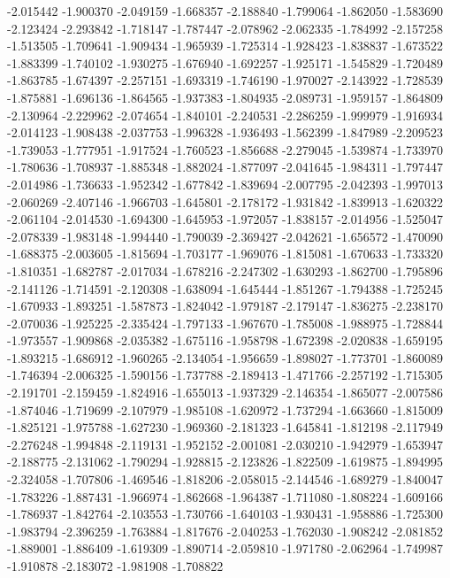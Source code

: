-2.015442
-1.900370
-2.049159
-1.668357
-2.188840
-1.799064
-1.862050
-1.583690
-2.123424
-2.293842
-1.718147
-1.787447
-2.078962
-2.062335
-1.784992
-2.157258
-1.513505
-1.709641
-1.909434
-1.965939
-1.725314
-1.928423
-1.838837
-1.673522
-1.883399
-1.740102
-1.930275
-1.676940
-1.692257
-1.925171
-1.545829
-1.720489
-1.863785
-1.674397
-2.257151
-1.693319
-1.746190
-1.970027
-2.143922
-1.728539
-1.875881
-1.696136
-1.864565
-1.937383
-1.804935
-2.089731
-1.959157
-1.864809
-2.130964
-2.229962
-2.074654
-1.840101
-2.240531
-2.286259
-1.999979
-1.916934
-2.014123
-1.908438
-2.037753
-1.996328
-1.936493
-1.562399
-1.847989
-2.209523
-1.739053
-1.777951
-1.917524
-1.760523
-1.856688
-2.279045
-1.539874
-1.733970
-1.780636
-1.708937
-1.885348
-1.882024
-1.877097
-2.041645
-1.984311
-1.797447
-2.014986
-1.736633
-1.952342
-1.677842
-1.839694
-2.007795
-2.042393
-1.997013
-2.060269
-2.407146
-1.966703
-1.645801
-2.178172
-1.931842
-1.839913
-1.620322
-2.061104
-2.014530
-1.694300
-1.645953
-1.972057
-1.838157
-2.014956
-1.525047
-2.078339
-1.983148
-1.994440
-1.790039
-2.369427
-2.042621
-1.656572
-1.470090
-1.688375
-2.003605
-1.815694
-1.703177
-1.969076
-1.815081
-1.670633
-1.733320
-1.810351
-1.682787
-2.017034
-1.678216
-2.247302
-1.630293
-1.862700
-1.795896
-2.141126
-1.714591
-2.120308
-1.638094
-1.645444
-1.851267
-1.794388
-1.725245
-1.670933
-1.893251
-1.587873
-1.824042
-1.979187
-2.179147
-1.836275
-2.238170
-2.070036
-1.925225
-2.335424
-1.797133
-1.967670
-1.785008
-1.988975
-1.728844
-1.973557
-1.909868
-2.035382
-1.675116
-1.958798
-1.672398
-2.020838
-1.659195
-1.893215
-1.686912
-1.960265
-2.134054
-1.956659
-1.898027
-1.773701
-1.860089
-1.746394
-2.006325
-1.590156
-1.737788
-2.189413
-1.471766
-2.257192
-1.715305
-2.191701
-2.159459
-1.824916
-1.655013
-1.937329
-2.146354
-1.865077
-2.007586
-1.874046
-1.719699
-2.107979
-1.985108
-1.620972
-1.737294
-1.663660
-1.815009
-1.825121
-1.975788
-1.627230
-1.969360
-2.181323
-1.645841
-1.812198
-2.117949
-2.276248
-1.994848
-2.119131
-1.952152
-2.001081
-2.030210
-1.942979
-1.653947
-2.188775
-2.131062
-1.790294
-1.928815
-2.123826
-1.822509
-1.619875
-1.894995
-2.324058
-1.707806
-1.469546
-1.818206
-2.058015
-2.144546
-1.689279
-1.840047
-1.783226
-1.887431
-1.966974
-1.862668
-1.964387
-1.711080
-1.808224
-1.609166
-1.786937
-1.842764
-2.103553
-1.730766
-1.640103
-1.930431
-1.958886
-1.725300
-1.983794
-2.396259
-1.763884
-1.817676
-2.040253
-1.762030
-1.908242
-2.081852
-1.889001
-1.886409
-1.619309
-1.890714
-2.059810
-1.971780
-2.062964
-1.749987
-1.910878
-2.183072
-1.981908
-1.708822
